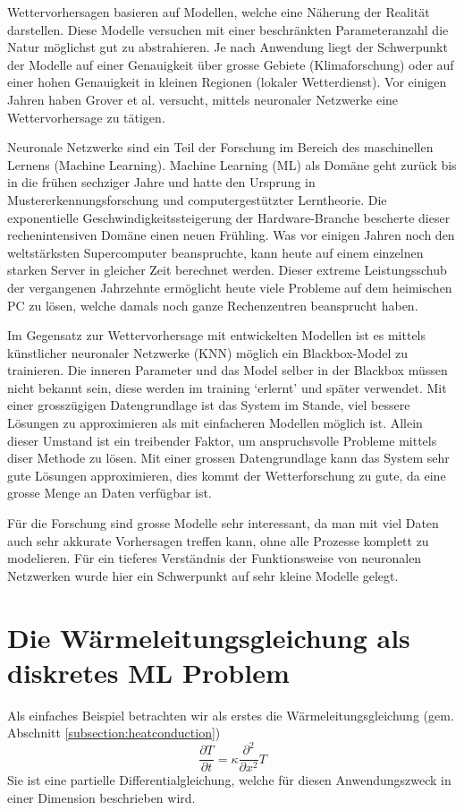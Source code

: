 Wettervorhersagen basieren auf Modellen, welche eine Näherung der
Realität darstellen. Diese Modelle versuchen mit einer beschränkten
Parameteranzahl die Natur möglichst gut zu abstrahieren. Je nach
Anwendung liegt der Schwerpunkt der Modelle auf einer Genauigkeit
über grosse Gebiete (Klimaforschung) oder auf einer hohen Genauigkeit
in kleinen Regionen (lokaler Wetterdienst). Vor einigen Jahren haben
Grover et al. \cite{grover:2015} versucht, mittels neuronaler
Netzwerke eine Wettervorhersage zu tätigen.

Neuronale Netzwerke sind ein Teil der Forschung im Bereich des
maschinellen Lernens (Machine Learning). Machine Learning (ML) als
Domäne geht zurück bis in die frühen sechziger Jahre und hatte den
Ursprung in Mustererkennungsforschung und computergestützter
Lerntheorie. Die exponentielle Geschwindigkeitssteigerung der
Hardware-Branche bescherte dieser rechenintensiven Domäne einen
neuen Frühling. Was vor einigen Jahren noch den weltstärksten
Supercomputer beanspruchte, kann heute auf einem einzelnen starken
Server in gleicher Zeit berechnet werden. Dieser extreme Leistungsschub
der vergangenen Jahrzehnte ermöglicht heute viele Probleme auf dem
heimischen PC zu lösen, welche damals noch ganze Rechenzentren
beansprucht haben.

Im Gegensatz zur Wettervorhersage mit entwickelten Modellen ist es
mittels künstlicher neuronaler Netzwerke (KNN) möglich ein
Blackbox-Model zu trainieren. Die inneren Parameter und das Model
selber in der Blackbox müssen nicht bekannt sein, diese werden im
training `erlernt' und später verwendet. Mit einer grosszügigen
Datengrundlage ist das System im Stande, viel bessere Lösungen zu
approximieren als mit einfacheren Modellen möglich ist. Allein
dieser Umstand ist ein treibender Faktor, um anspruchsvolle Probleme
mittels diser Methode zu lösen. Mit einer grossen Datengrundlage
kann das System sehr gute Lösungen approximieren, dies kommt der
Wetterforschung zu gute, da eine grosse Menge an Daten verfügbar
ist.

Für die Forschung sind grosse Modelle sehr interessant, da man mit
viel Daten auch sehr akkurate Vorhersagen treffen kann, ohne alle
Prozesse komplett zu modelieren. Für ein tieferes Verständnis der
Funktionsweise von neuronalen Netzwerken wurde hier ein Schwerpunkt
auf sehr kleine Modelle gelegt.

\section{Die Wärmeleitungsgleichung als diskretes ML Problem\label{section:heat-ml}}
Als einfaches Beispiel betrachten wir als erstes die Wärmeleitungsgleichung
(gem. Abschnitt \ref{subsection:heatconduction})
\begin{equation}
\frac{\partial T}{\partial t} = \kappa \frac{\partial^2}{\partial x^2} T
\end{equation}
Sie ist eine partielle Differentialgleichung, welche für diesen
Anwendungszweck in einer Dimension beschrieben wird.

